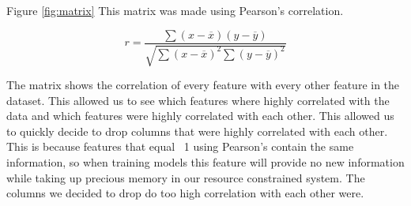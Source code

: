 \documentclass[sigconf]{acmart}
\begin{document}
Figure \ref{fig:matrix} This matrix was made using Pearson's correlation. 

\begin{equation}
r=\frac{\sum(x-\overline{x})(y-\overline{y})}{\sqrt{\sum(x-\overline{x})^{2} \sum(y-\overline{y})^{2}}}
\end{equation}

 The matrix shows the correlation of every feature with every other feature in the dataset. This allowed us to see which features where highly correlated with the data and which features were highly correlated with each other. 
 This allowed us to quickly decide to drop columns that were highly correlated with each other. This is because features that equal ~1 using Pearson's contain the same information, so when training models this feature will provide no new information while taking up precious memory in our resource constrained system. The columns we decided to drop do too high correlation with each other were.
\end{document}
